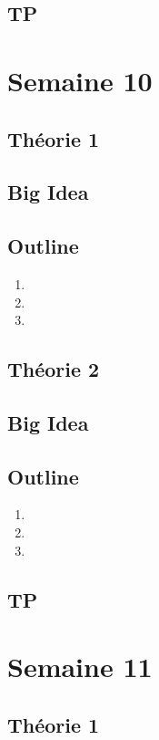 \documentclass{article}
\begin{document}
\subsection{TP}

\pagebreak
\section{Semaine 10}
\subsection{Théorie 1}
\subsection*{Big Idea}
\subsection*{Outline}
\begin{enumerate}
    \item
    \item
    \item
\end{enumerate}
\subsection{Théorie 2}
\subsection*{Big Idea}
\subsection*{Outline}
\begin{enumerate}
    \item
    \item
    \item
\end{enumerate}
\subsection{TP}

\pagebreak
\section{Semaine 11}
\subsection{Théorie 1}
\end{document}
